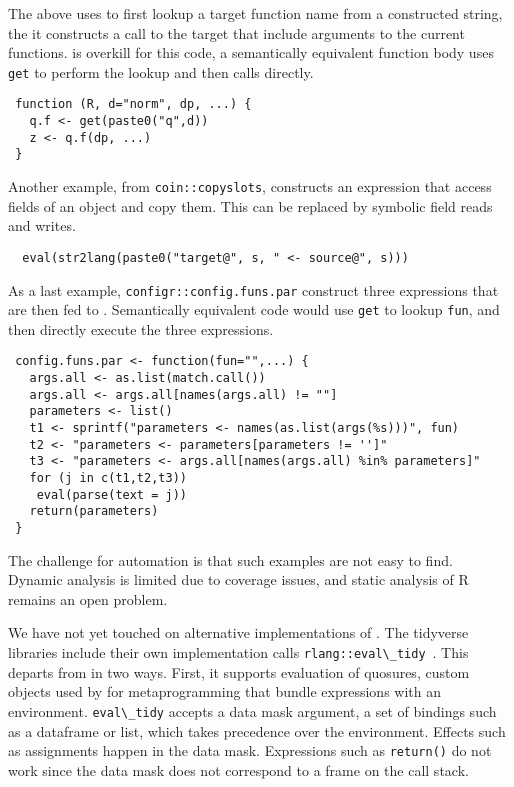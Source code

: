 \documentclass[screen,acmsmall]{acmart}%
\renewcommand{\k}[1]{\lstinline |#1|\xspace}
\begin{document}
The above uses \eval to first lookup a target function name from a constructed
string, the it constructs a call to the target that include arguments to the
current functions. \Eval is overkill for this code, a semantically equivalent
function body uses \k{get} to perform the lookup and then calls directly.

\begin{lstlisting}
 function (R, d="norm", dp, ...) {
   q.f <- get(paste0("q",d))
   z <- q.f(dp, ...)
 }
\end{lstlisting}

Another example, from \k{coin::copyslots}, constructs an expression that access
fields of an object and copy them. This can be replaced by symbolic field reads
and writes.

\begin{lstlisting}
  eval(str2lang(paste0("target@", s, " <- source@", s)))
\end{lstlisting}

As a last example, \k{configr::config.funs.par} construct three expressions
that are then fed to \eval. Semantically equivalent code would use \k{get}
to lookup \k{fun}, and then directly execute the three expressions.

\begin{lstlisting}
 config.funs.par <- function(fun="",...) {
   args.all <- as.list(match.call())
   args.all <- args.all[names(args.all) != ""]
   parameters <- list()
   t1 <- sprintf("parameters <- names(as.list(args(%s)))", fun)
   t2 <- "parameters <- parameters[parameters != '']"
   t3 <- "parameters <- args.all[names(args.all) %in% parameters]"
   for (j in c(t1,t2,t3))
    eval(parse(text = j))
   return(parameters)
 }
\end{lstlisting}

The challenge for automation is that such examples are not easy to find. Dynamic
analysis is limited due to coverage issues, and static analysis of R remains an
open problem.

We have not yet touched on alternative implementations of \eval. The tidyverse
libraries include their own implementation calls
\k{rlang::eval\_tidy}~\cite{tidyverse}. This departs from \eval in two ways.
First, it supports evaluation of quosures, custom objects used by for
metaprogramming that bundle expressions with an environment. \k{eval\_tidy}
accepts a data mask argument, a set of bindings such as a dataframe or list,
which takes precedence over the environment. Effects such as assignments happen
in the data mask. Expressions such as \k{return()} do not work since the data
mask does not correspond to a frame on the call stack.
\end{document}
